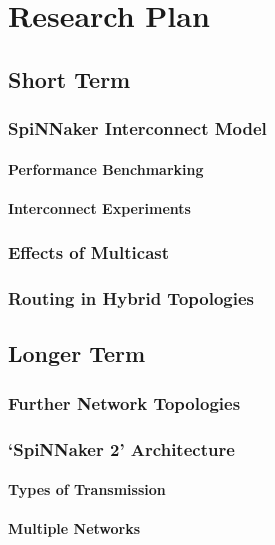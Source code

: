 \chapter{Research Plan}

	\section{Short Term}
		
		\subsection{SpiNNaker Interconnect Model}
		
			\subsubsection{Performance Benchmarking}
			
			\subsubsection{Interconnect Experiments}
		
		\subsection{Effects of Multicast}
		
		\subsection{Routing in Hybrid Topologies}
	
	\section{Longer Term}
		
		\subsection{Further Network Topologies}
		
		\subsection{`SpiNNaker 2' Architecture}
			
			\subsubsection{Types of Transmission}
			
			\subsubsection{Multiple Networks}

